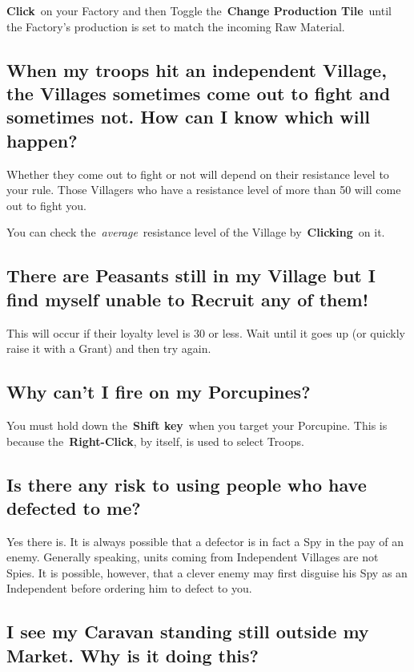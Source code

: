 \textbf{Click} on your Factory and then Toggle the \textbf{Change Production Tile} until the Factory’s production is set to match the incoming Raw Material.

\subsection{When my troops hit an independent Village, the Villages sometimes come out to fight and sometimes not. How can I know which will happen?}

Whether they come out to fight or not will depend on their resistance level to your rule. Those Villagers who have a resistance level of more than 50 will come out to fight you.

You can check the \textit{average} resistance level of the Village by \textbf{Clicking} on it.

\subsection{There are Peasants still in my Village but I find myself unable to Recruit any of them!}

This will occur if their loyalty level is 30 or less. Wait until it goes up (or quickly raise it with a Grant) and then try again.

\subsection{Why can’t I fire on my Porcupines?}

You must hold down the \textbf{Shift key} when you target your Porcupine. This is because the \textbf{Right-Click}, by itself, is used to select Troops.

\subsection{Is there any risk to using people who have defected to me?}

Yes there is. It is always possible that a defector is in fact a Spy in the pay of an enemy. Generally speaking, units coming from Independent Villages are not Spies. It is possible, however, that a clever enemy may first disguise his Spy as an Independent before ordering him to defect to you.

\subsection{I see my Caravan standing still outside my Market. Why is it doing this?}

